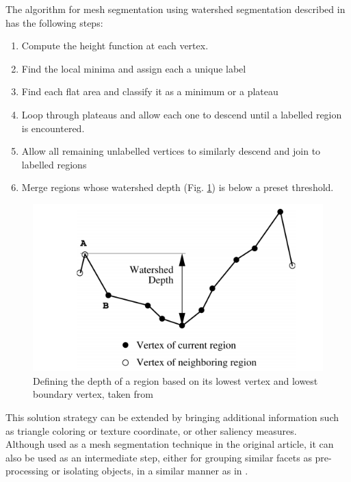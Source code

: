 \documentclass{kththesis}
\begin{document}
The algorithm for mesh segmentation using watershed segmentation described in \textcite{ManganMeshWatershed} has the following steps: 
\begin{enumerate}
    \item Compute the  height
function at each vertex.
    \item Find the local minima and assign each a unique
label
    \item Find each flat area and classify it as a minimum or a
plateau
    \item Loop through plateaus and allow each one to
descend until a labelled region is encountered.
    \item Allow all remaining unlabelled vertices to similarly
descend and join to labelled regions
    \item Merge regions whose watershed depth (Fig. \ref{fig:WSdepth}) is below a
preset threshold.
\end{enumerate}


\begin{figure}[H]
    \centering
    \includegraphics[width=\textwidth]{images/watershed_depth.png}
    \caption{Defining the depth of a region based on its lowest vertex and lowest boundary vertex, taken from \parencite{ManganMeshWatershed}}
    \label{fig:WSdepth}
\end{figure}

This solution strategy can be extended by bringing additional information such as triangle coloring or texture coordinate, or other saliency measures. \\ 
Although used as a mesh segmentation technique in the original article, it can also be used as an intermediate step, either for grouping similar facets as pre-processing or isolating objects, in a similar manner as in \parencite{det_seg_class}. 
\end{document}
